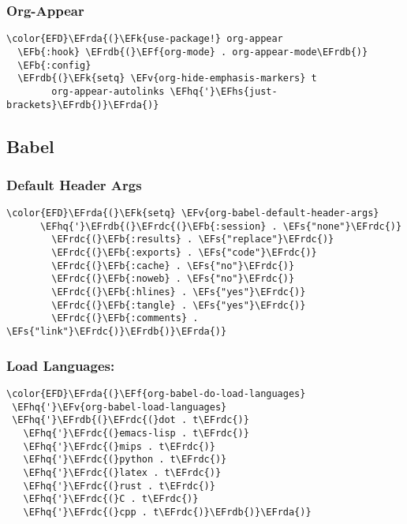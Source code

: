\documentclass{article}
\newcommand{\EFs}[1]{\textcolor{EFs}{#1}} %
\newcommand{\EFk}[1]{\textcolor{EFk}{#1}} %
\newcommand{\EFb}[1]{\textcolor{EFb}{#1}} %
\newcommand{\EFf}[1]{\textcolor{EFf}{#1}} %
\newcommand{\EFv}[1]{\textcolor{EFv}{#1}} %
\newcommand{\EFhq}[1]{#1} %
\newcommand{\EFhs}[1]{\textcolor{EFhs}{#1}} %
\newcommand{\EFrda}[1]{\textcolor{EFrda}{#1}} %
\newcommand{\EFrdb}[1]{\textcolor{EFrdb}{#1}} %
\newcommand{\EFrdc}[1]{\textcolor{EFrdc}{#1}} %
\begin{document}
\subsubsection{Org-Appear}
\label{sec:orge5e7d14}
\begin{Code}
\begin{Verbatim}
\color{EFD}\EFrda{(}\EFk{use-package!} org-appear
  \EFb{:hook} \EFrdb{(}\EFf{org-mode} . org-appear-mode\EFrdb{)}
  \EFb{:config}
  \EFrdb{(}\EFk{setq} \EFv{org-hide-emphasis-markers} t
        org-appear-autolinks \EFhq{'}\EFhs{just-brackets}\EFrdb{)}\EFrda{)}
\end{Verbatim}
\end{Code}

\subsection{Babel}
\label{sec:orgf05a0eb}
\subsubsection{Default Header Args}
\label{sec:orgea60e8e}
\begin{Code}
\begin{Verbatim}
\color{EFD}\EFrda{(}\EFk{setq} \EFv{org-babel-default-header-args}
      \EFhq{'}\EFrdb{(}\EFrdc{(}\EFb{:session} . \EFs{"none"}\EFrdc{)}
        \EFrdc{(}\EFb{:results} . \EFs{"replace"}\EFrdc{)}
        \EFrdc{(}\EFb{:exports} . \EFs{"code"}\EFrdc{)}
        \EFrdc{(}\EFb{:cache} . \EFs{"no"}\EFrdc{)}
        \EFrdc{(}\EFb{:noweb} . \EFs{"no"}\EFrdc{)}
        \EFrdc{(}\EFb{:hlines} . \EFs{"yes"}\EFrdc{)}
        \EFrdc{(}\EFb{:tangle} . \EFs{"yes"}\EFrdc{)}
        \EFrdc{(}\EFb{:comments} . \EFs{"link"}\EFrdc{)}\EFrdb{)}\EFrda{)}

\end{Verbatim}
\end{Code}

\subsubsection{Load Languages:}
\label{sec:org225e329}
\begin{Code}
\begin{Verbatim}
\color{EFD}\EFrda{(}\EFf{org-babel-do-load-languages}
 \EFhq{'}\EFv{org-babel-load-languages}
 \EFhq{'}\EFrdb{(}\EFrdc{(}dot . t\EFrdc{)}
   \EFhq{'}\EFrdc{(}emacs-lisp . t\EFrdc{)}
   \EFhq{'}\EFrdc{(}mips . t\EFrdc{)}
   \EFhq{'}\EFrdc{(}python . t\EFrdc{)}
   \EFhq{'}\EFrdc{(}latex . t\EFrdc{)}
   \EFhq{'}\EFrdc{(}rust . t\EFrdc{)}
   \EFhq{'}\EFrdc{(}C . t\EFrdc{)}
   \EFhq{'}\EFrdc{(}cpp . t\EFrdc{)}\EFrdb{)}\EFrda{)}
\end{Verbatim}
\end{Code}
\end{document}
